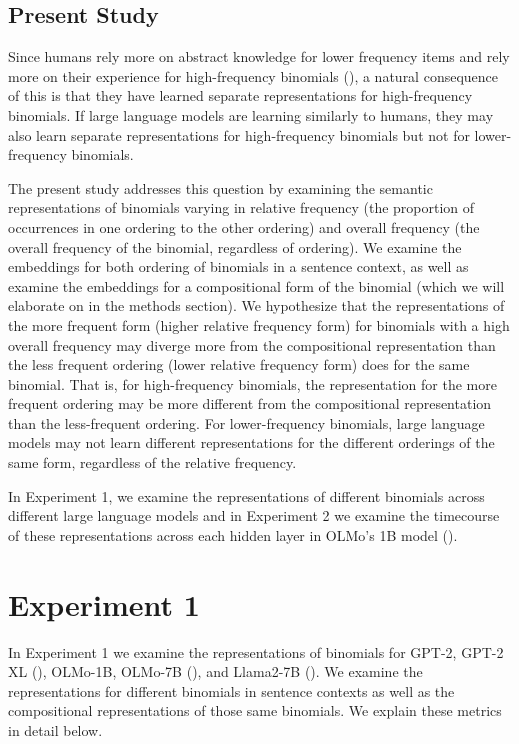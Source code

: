 \documentclass[
  12pt,
  letterpaper,
]{scrreprt}
\begin{document}
\subsection{Present Study}\label{present-study-2}

Since humans rely more on abstract knowledge for lower frequency items
and rely more on their experience for high-frequency binomials
(), a natural consequence
of this is that they have learned separate representations for
high-frequency binomials. If large language models are learning
similarly to humans, they may also learn separate representations for
high-frequency binomials but not for lower-frequency binomials.

The present study addresses this question by examining the semantic
representations of binomials varying in relative frequency (the
proportion of occurrences in one ordering to the other ordering) and
overall frequency (the overall frequency of the binomial, regardless of
ordering). We examine the embeddings for both ordering of binomials in a
sentence context, as well as examine the embeddings for a compositional
form of the binomial (which we will elaborate on in the methods
section). We hypothesize that the representations of the more frequent
form (higher relative frequency form) for binomials with a high overall
frequency may diverge more from the compositional representation than
the less frequent ordering (lower relative frequency form) does for the
same binomial. That is, for high-frequency binomials, the representation
for the more frequent ordering may be more different from the
compositional representation than the less-frequent ordering. For
lower-frequency binomials, large language models may not learn different
representations for the different orderings of the same form, regardless
of the relative frequency.

In Experiment 1, we examine the representations of different binomials
across different large language models and in Experiment 2 we examine
the timecourse of these representations across each hidden layer in
OLMo's 1B model
().

\section{Experiment 1}\label{experiment-1-2}

In Experiment 1 we examine the representations of binomials for GPT-2,
GPT-2 XL (), OLMo-1B, OLMo-7B
(), and Llama2-7B (). We examine the representations for different binomials in
sentence contexts as well as the compositional representations of those
same binomials. We explain these metrics in detail below.
\end{document}
